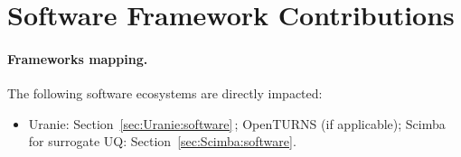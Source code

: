 \section{Software Framework Contributions}

\paragraph{Frameworks mapping.} The following software ecosystems are directly impacted:
\begin{itemize}
	\item Uranie: Section~\ref{sec:Uranie:software}\,; OpenTURNS (if applicable); Scimba for surrogate UQ: Section~\ref{sec:Scimba:software}.
\end{itemize}

